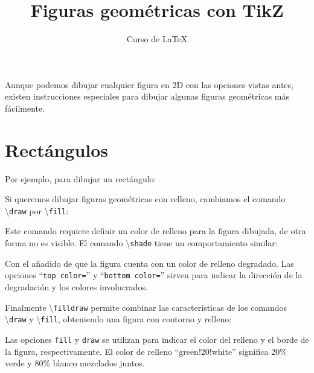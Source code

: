 \documentclass[12pt,letterpaper]{article}
\author{Curso de \LaTeX}
\title{Figuras geométricas con TikZ}
\begin{document}
\maketitle

Aunque podemos dibujar cualquier figura en 2D con las opciones vistas antes, existen instrucciones especiales para dibujar algunas figuras geométricas más fácilmente.

\section*{Rectángulos}

Por ejemplo, para dibujar un rectángulo:


Si queremos dibujar figuras geométricas con relleno, cambiamos el comando \textbackslash\texttt{draw} por \textbackslash\texttt{fill}:


Este comando requiere definir un color de relleno para la figura dibujada, de otra forma no es visible. El comando \textbackslash\texttt{shade} tiene un comportamiento similar:


Con el añadido de que la figura cuenta con un color de relleno degradado. Las opciones ``\texttt{top color=}'' y ``\texttt{bottom color=}'' sirven para indicar la dirección de la degradación y los colores involucrados. 

Finalmente \textbackslash\texttt{filldraw} permite combinar las características de los comandos \textbackslash\texttt{draw} y \textbackslash\texttt{fill}, obteniendo una figura con contorno y relleno:


Las opciones \texttt{fill} y \texttt{draw} se utilizan para indicar el color del relleno y el borde de la figura, respectivamente. El color de relleno ``green!20!white'' significa 20\% verde y 80\% blanco mezclados juntos.
\end{document}

